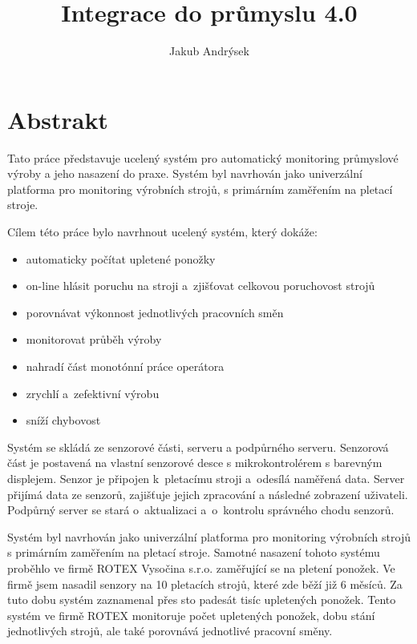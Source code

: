 \documentclass[12pt, a4paper]{article}
\title{Integrace do průmyslu 4.0}
\author{Jakub Andrýsek}
\date{}
\begin{document}

\maketitle

\section*{Abstrakt}
Tato práce představuje ucelený systém pro automatický monitoring průmyslové výroby a jeho nasazení do praxe.
Systém byl navrhován jako univerzální platforma pro monitoring výrobních strojů, s primárním zaměřením na pletací stroje.

Cílem této práce bylo navrhnout ucelený systém, který dokáže:

\begin{itemize}
    \item automaticky počítat upletené ponožky
    \item on-line hlásit poruchu na stroji a~zjišťovat celkovou poruchovost strojů
    \item porovnávat výkonnost jednotlivých pracovních směn
    \item monitorovat průběh výroby
    \item nahradí část monotónní práce operátora
    \item zrychlí a~zefektivní výrobu
    \item sníží chybovost
\end{itemize}

Systém se skládá ze senzorové části, serveru a podpůrného serveru.
Senzorová část je postavená na vlastní senzorové desce s mikrokontrolérem s barevným displejem. Senzor je připojen k~pletacímu stroji a~odesílá naměřená data.
Server přijímá  data ze senzorů, zajišťuje jejich zpracování a následné zobrazení uživateli.
Podpůrný server se stará o~aktualizaci a~o~kontrolu správného chodu senzorů.

Systém byl navrhován jako univerzální platforma pro monitoring výrobních strojů s primárním zaměřením na pletací stroje. 
Samotné nasazení tohoto systému proběhlo ve firmě ROTEX Vysočina s.r.o. zaměřující se na pletení ponožek. 
Ve firmě jsem nasadil senzory na 10 pletacích strojů, které zde běží již 6 měsíců. 
Za tuto dobu systém zaznamenal přes sto padesát tisíc upletených ponožek.
Tento systém ve firmě ROTEX monitoruje počet upletených ponožek, dobu stání jednotlivých strojů, ale také porovnává jednotlivé pracovní směny.
\end{document}
